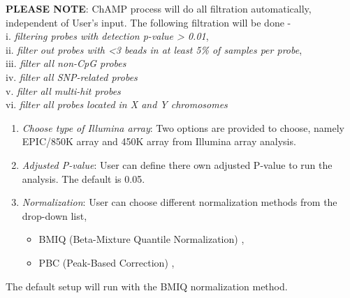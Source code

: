 \documentclass[
  a4paper,
  oneside,
  open=any]{scrreport}
\providecommand{\tightlist}{%
  \setlength{\itemsep}{0pt}\setlength{\parskip}{0pt}}\usepackage{longtable,booktabs,array}
\begin{document}
\begin{tcolorbox}[enhanced jigsaw, bottomrule=.15mm, left=2mm, coltitle=black, breakable, colback=white, arc=.35mm, rightrule=.15mm, opacitybacktitle=0.6, toptitle=1mm, leftrule=.75mm, toprule=.15mm, bottomtitle=1mm, opacityback=0, colbacktitle=quarto-callout-note-color!10!white, titlerule=0mm, colframe=quarto-callout-note-color-frame, title=\textcolor{quarto-callout-note-color}{\faInfo}\hspace{0.5em}{Note}]

\textbf{PLEASE NOTE}: ChAMP process will do all filtration
automatically, independent of User's input. The following filtration
will be done -\\
i. \emph{filtering probes with detection p-value \textgreater{} 0.01},\\
ii. \emph{filter out probes with \textless3 beads in at least 5\% of
samples per probe},\\
iii. \emph{filter all non-CpG probes}\\
iv. \emph{filter all SNP-related probes}\\
v. \emph{filter all multi-hit probes}\\
vi. \emph{filter all probes located in X and Y chromosomes}

\end{tcolorbox}

\begin{enumerate}
\def\labelenumi{\arabic{enumi}.}
\item
  \emph{Choose type of Illumina array}: Two options are provided to
  choose, namely EPIC/850K array and 450K array from Illumina array
  analysis.
\item
  \emph{Adjusted P-value}: User can define there own adjusted P-value to
  run the analysis. The default is 0.05.
\item
  \emph{Normalization}: User can choose different normalization methods
  from the drop-down list,

  \begin{itemize}
  \tightlist
  \item
    BMIQ (Beta-Mixture Quantile Normalization)
    \autocite{teschendorff2013beta},
  \item
    PBC (Peak-Based Correction) \autocite{dedeurwaerder2011evaluation},
  \end{itemize}
\end{enumerate}

The default setup will run with the BMIQ normalization method.
\end{document}
